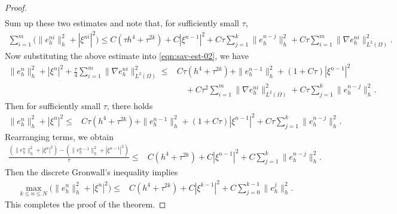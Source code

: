 \documentclass[a4paper, oneside]{book}
\def\II{(\Omega)}
\begin{document}
\begin{proof}
\begin{equation*}
\begin{split}
\end{split}
\end{equation*}
Sum up these two estimates and note that,
for sufficiently small $\tau$,
\begin{equation*}
\begin{split}
 \sum_{i=1}^m \Big(\|e_h^{ni}\|_h^2+ |\xi^{ni}|^2\Big)  \le C(\tau h^4 + \tau^{2k})+C|\xi^{n-1}|^2
 + C\tau \sum_{j=1}^k \| e_h^{n-j} \|_h^2 +
 C\tau \sum_{i=1}^m \| \nabla e_h^{ni}  \|_{L^2\II}^2.
\end{split}
\end{equation*}
Now substituting the above estimate into \eqref{eqn:sav-est-02}, we have
\begin{equation*}%
\begin{split}
 \|e_h^{n}\|_h^2 + |\xi^n|^2 + \frac\tau4 \sum_{i=1}^m \| \nabla e_h^{ni} \|_{L^2\II}^2
 \le&  C\tau(h^4+ \tau^{2k}) +  \|e_h^{n-1}\|_h^2 + (1+C \tau) |\xi^{n-1}|^2   \\
&\quad + C\tau^2 \sum_{i=1}^m \| \nabla e_h^{ni}  \|_{L^2\II}^2
+ C\tau  \sum_{j=1}^{k} \|  e_h^{n-j} \|_h^2.
\end{split}
\end{equation*}
Then for sufficiently small $\tau$, there holds
\begin{equation*}
\begin{split}
 \|e_h^{n}\|_h^2 + |\xi^n|^2
 \le&  C\tau(h^4+ \tau^{2k}) +  \|e_h^{n-1}\|_h^2 + (1+C \tau) |\xi^{n-1}|^2   + C\tau  \sum_{j=1}^{k} \|  e_h^{n-j} \|_h^2.
\end{split}
\end{equation*}
Rearranging terms, we obtain
\begin{equation*}
\begin{split}
 \frac{(\|e_h^{n}\|_h^2 + |\xi^n|^2) - (\|e_h^{n-1}\|_h^2 + |\xi^{n-1}|^2)}{\tau}
 \le&  C (h^4+ \tau^{2k})  + C |\xi^{n-1}|^2   + C \sum_{j=1}^{k} \|  e_h^{n-j} \|_h^2.
\end{split}
\end{equation*}
Then the discrete Gronwall's inequality implies
\begin{equation*}
\begin{split}
\max_{k \le n\le N} \Big(\|e_h^{n}\|_h^2 + |\xi^n|^2\Big)
 \le&  C (h^4+ \tau^{2k})  + C |\xi^{k-1}|^2    + C \sum_{j=0}^{k-1} \|  e_h^{j} \|_h^2.
\end{split}
\end{equation*}
This completes the proof of the theorem.
\end{proof}
\end{document}

